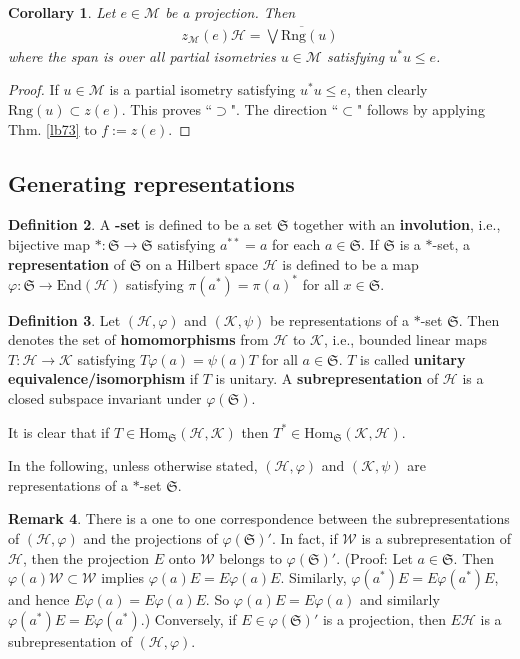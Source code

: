 \documentclass[12pt,b5paper,notitlepage]{article}
\theoremstyle{definition}
\newtheorem{df}{Definition}[section]
\newtheorem{rem}[df]{Remark}
\theoremstyle{plain}
\newtheorem{co}[df]{Corollary}
\newcommand{\fk}{\mathfrak}
\newcommand{\mc}{\mathcal}
\newcommand{\ovl}{\overline}
\newcommand{\End}{\mathrm{End}} %
\newcommand{\Hom}{\mathrm{Hom}}
\newcommand{\Rng}{\mathrm{Rng}}
\numberwithin{equation}{section}
\begin{document}
\begin{co}
Let $e\in\mc M$ be a projection. Then 
\begin{align*}
z_{\mc M}(e)\mc H=\ovl{\bigvee\Rng(u)}
\end{align*}
where the span is over all partial isometries $u\in\mc M$ satisfying $u^*u\leq e$.
\end{co}

\begin{proof}
If $u\in\mc M$ is a partial isometry satisfying $u^*u\leq e$, then clearly $\Rng(u)\subset z(e)$. This proves ``$\supset$". The direction ``$\subset$" follows by applying Thm. \ref{lb73} to $f:=z(e)$.
\end{proof}




\subsection*{Generating representations}


\begin{df}
A \pmb{$*$}\textbf{-set} is defined to be a set $\fk S$ together with an \textbf{involution}, i.e., bijective map $*:\fk S\rightarrow\fk S$ satisfying $a^{**}=a$ for each $a\in\fk S$. If $\fk S$ is a $*$-set, a \textbf{representation} of $\fk S$ on a Hilbert space $\mc H$ is defined to be a map $\varphi:\fk S\rightarrow\End(\mc H)$ satisfying $\pi(a^*)=\pi(a)^*$ for all $x\in\fk S$.
\end{df}

\begin{df}
Let $(\mc H,\varphi)$ and $(\mc K,\psi)$ be representations of a $*$-set $\fk S$. Then \pmb{$\Hom_{\fk S}(\mc H,\mc K)$} denotes the set of \textbf{homomorphisms} from $\mc H$ to $\mc K$, i.e., bounded linear maps $T:\mc H\rightarrow\mc K$ satisfying $T\varphi(a)=\psi(a)T$ for all $a\in\fk S$. $T$ is called \textbf{unitary equivalence/isomorphism} if $T$ is unitary. A \textbf{subrepresentation} of $\mc H$ is a closed subspace invariant under $\varphi(\fk S)$. 
\end{df}

It is clear that if $T\in\Hom_{\fk S}(\mc H,\mc K)$ then $T^*\in\Hom_{\fk S}(\mc K,\mc H)$.

In the following, unless otherwise stated, $(\mc H,\varphi)$ and $(\mc K,\psi)$ are representations of a $*$-set $\fk S$. 


\begin{rem}
There is a one to one correspondence between the subrepresentations of $(\mc H,\varphi)$ and the projections of $\varphi(\fk S)'$. In fact, if $\mc W$ is a subrepresentation of $\mc H$, then the projection $E$ onto $\mc W$ belongs to $\varphi(\fk S)'$. (Proof: Let $a\in\fk S$. Then $\varphi(a)\mc W\subset\mc W$ implies $\varphi(a)E=E\varphi(a)E$. Similarly, $\varphi(a^*)E=E\varphi(a^*)E$, and hence $E\varphi(a)=E\varphi(a)E$. So $\varphi(a)E=E\varphi(a)$ and similarly $\varphi(a^*)E=E\varphi(a^*)$.) Conversely, if $E\in\varphi(\fk S)'$ is a projection, then $E\mc H$ is a subrepresentation of $(\mc H,\varphi)$.
\end{rem}
\end{document}
